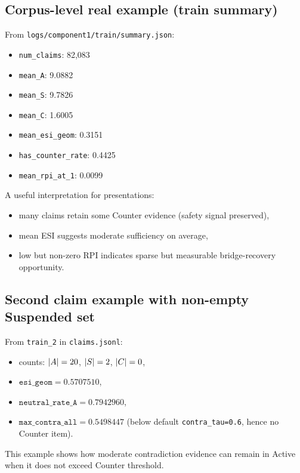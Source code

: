 \subsection{Corpus-level real example (train summary)}
From \texttt{logs/component1/train/summary.json}:
\begin{itemize}
\item \texttt{num\_claims}: 82,083
\item \texttt{mean\_A}: 9.0882
\item \texttt{mean\_S}: 9.7826
\item \texttt{mean\_C}: 1.6005
\item \texttt{mean\_esi\_geom}: 0.3151
\item \texttt{has\_counter\_rate}: 0.4425
\item \texttt{mean\_rpi\_at\_1}: 0.0099
\end{itemize}

A useful interpretation for presentations:
\begin{itemize}
\item many claims retain some Counter evidence (safety signal preserved),
\item mean ESI suggests moderate sufficiency on average,
\item low but non-zero RPI indicates sparse but measurable bridge-recovery opportunity.
\end{itemize}

\subsection{Second claim example with non-empty Suspended set}
From \texttt{train\_2} in \texttt{claims.jsonl}:
\begin{itemize}
\item counts: $|A|=20$, $|S|=2$, $|C|=0$,
\item $\texttt{esi\_geom}=0.5707510$,
\item $\texttt{neutral\_rate\_A}=0.7942960$,
\item $\texttt{max\_contra\_all}=0.5498447$ (below default \texttt{contra\_tau=0.6}, hence no Counter item).
\end{itemize}
This example shows how moderate contradiction evidence can remain in Active when it does not exceed Counter threshold.
